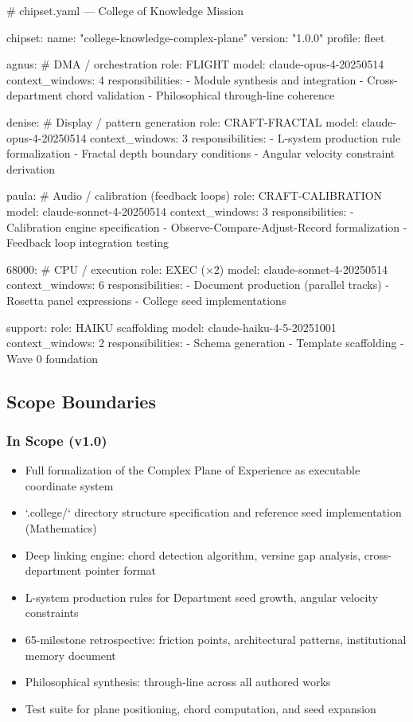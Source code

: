 \documentclass[11pt,letterpaper]{article}
\begin{document}
\begin{asciibox}
# chipset.yaml — College of Knowledge Mission

chipset:
  name: "college-knowledge-complex-plane"
  version: "1.0.0"
  profile: fleet

  agnus:           # DMA / orchestration
    role: FLIGHT
    model: claude-opus-4-20250514
    context_windows: 4
    responsibilities:
      - Module synthesis and integration
      - Cross-department chord validation
      - Philosophical through-line coherence

  denise:          # Display / pattern generation
    role: CRAFT-FRACTAL
    model: claude-opus-4-20250514
    context_windows: 3
    responsibilities:
      - L-system production rule formalization
      - Fractal depth boundary conditions
      - Angular velocity constraint derivation

  paula:           # Audio / calibration (feedback loops)
    role: CRAFT-CALIBRATION
    model: claude-sonnet-4-20250514
    context_windows: 3
    responsibilities:
      - Calibration engine specification
      - Observe-Compare-Adjust-Record formalization
      - Feedback loop integration testing

  68000:           # CPU / execution
    role: EXEC (×2)
    model: claude-sonnet-4-20250514
    context_windows: 6
    responsibilities:
      - Document production (parallel tracks)
      - Rosetta panel expressions
      - College seed implementations

  support:
    role: HAIKU scaffolding
    model: claude-haiku-4-5-20251001
    context_windows: 2
    responsibilities:
      - Schema generation
      - Template scaffolding
      - Wave 0 foundation
\end{asciibox}

\subsection{Scope Boundaries}

\subsubsection{In Scope (v1.0)}
\begin{itemize}[noitemsep]
  \item Full formalization of the Complex Plane of Experience as executable coordinate system
  \item `.college/` directory structure specification and reference seed implementation (Mathematics)
  \item Deep linking engine: chord detection algorithm, versine gap analysis, cross-department pointer format
  \item L-system production rules for Department seed growth, angular velocity constraints
  \item 65-milestone retrospective: friction points, architectural patterns, institutional memory document
  \item Philosophical synthesis: through-line across all authored works
  \item Test suite for plane positioning, chord computation, and seed expansion
\end{itemize}
\end{document}
